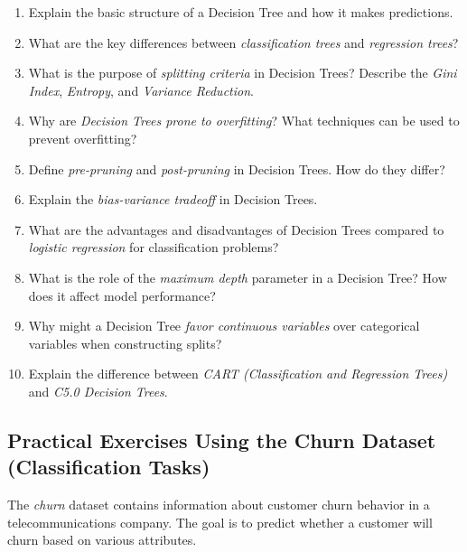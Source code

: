 \documentclass[
]{book}
\providecommand{\tightlist}{%
  \setlength{\itemsep}{0pt}\setlength{\parskip}{0pt}}
\theoremstyle{definition}
\theoremstyle{definition}
\theoremstyle{definition}
\theoremstyle{definition}
\theoremstyle{remark}
\begin{document}
\begin{enumerate}
\def\labelenumi{\arabic{enumi}.}
\tightlist
\item
  Explain the basic structure of a Decision Tree and how it makes predictions.\\
\item
  What are the key differences between \emph{classification trees} and \emph{regression trees}?\\
\item
  What is the purpose of \emph{splitting criteria} in Decision Trees? Describe the \emph{Gini Index}, \emph{Entropy}, and \emph{Variance Reduction}.\\
\item
  Why are \emph{Decision Trees prone to overfitting}? What techniques can be used to prevent overfitting?\\
\item
  Define \emph{pre-pruning} and \emph{post-pruning} in Decision Trees. How do they differ?\\
\item
  Explain the \emph{bias-variance tradeoff} in Decision Trees.\\
\item
  What are the advantages and disadvantages of Decision Trees compared to \emph{logistic regression} for classification problems?\\
\item
  What is the role of the \emph{maximum depth} parameter in a Decision Tree? How does it affect model performance?\\
\item
  Why might a Decision Tree \emph{favor continuous variables} over categorical variables when constructing splits?\\
\item
  Explain the difference between \emph{CART (Classification and Regression Trees)} and \emph{C5.0 Decision Trees}.
\end{enumerate}

\subsection*{Practical Exercises Using the Churn Dataset (Classification Tasks)}\label{practical-exercises-using-the-churn-dataset-classification-tasks}

The \emph{churn} dataset contains information about customer churn behavior in a telecommunications company. The goal is to predict whether a customer will churn based on various attributes.
\end{document}
